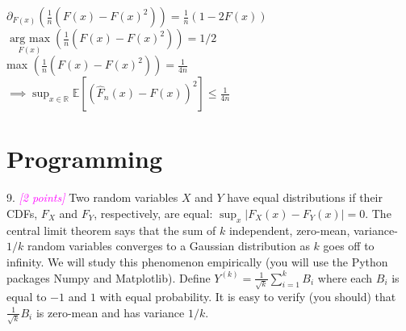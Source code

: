 \documentclass{article}
\newcommand{\field}[1]{\mathbb{#1}}
\newcommand{\1}{\mathbf{1}}
\newcommand{\E}{\mathbb{E}}
\newcommand{\R}{\field{R}} %
\newcommand{\grade}[1]{\small\textcolor{magenta}{\emph{[#1 points]}} \normalsize}
\begin{document}
\begin{enumerate}
	$\partial_{F(x)} (\frac{1}{n} (F(x)-F(x)^2))=\frac{1}{n} (1-2F(x))$\\
	$\underset{F(x)}{\operatorname{arg\ max}} (\frac{1}{n} (F(x)-F(x)^2))=1/2$\\
	max $(\frac{1}{n} (F(x)-F(x)^2))=\frac{1}{4n}$\\
	$\implies \displaystyle\sup_{x \in \R} \E[ ( \widehat{F}_n(x) - F(x) )^2 ] \leq \frac{1}{4n}$\\
	
\end{enumerate}

\section{Programming}

9. \grade{2} Two random variables $X$ and $Y$ have equal distributions if their CDFs, $F_X$ and $F_Y$, respectively, are equal: $\sup_{x} |F_X(x) - F_Y(x)| = 0$. 
The central limit theorem says that the sum of $k$ independent, zero-mean, variance-$1/k$ random variables converges to a Gaussian distribution as $k$ goes off to infinity.  
We will study this phenomenon empirically (you will use the Python packages Numpy and Matplotlib). 
Define $Y^{(k)} = \frac{1}{\sqrt{k}} \sum_{i=1}^k B_i$ where each $B_i$ is equal to $-1$ and $1$ with equal probability.
It is easy to verify (you should) that $\frac{1}{\sqrt{k}} B_i$ is zero-mean and has variance $1/k$.
\end{document}
